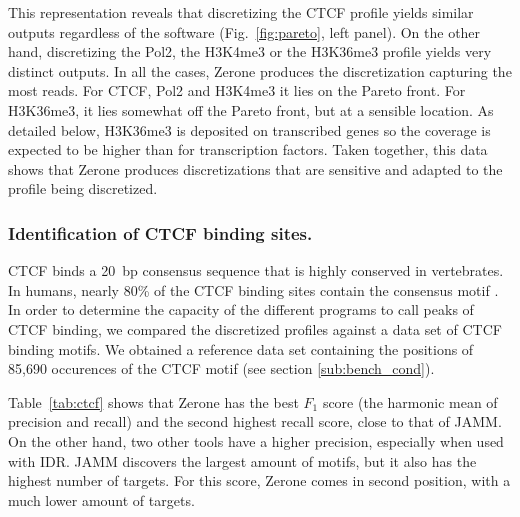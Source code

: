 \documentclass{bioinfo}
\begin{document}
This representation reveals that discretizing the CTCF profile yields
similar outputs regardless of the software (Fig.~\ref{fig:pareto},
left panel). On the other hand, discretizing the Pol2, the H3K4me3 or
the H3K36me3 profile yields very distinct outputs. In
all the cases, Zerone produces the discretization capturing the most
reads. For CTCF, Pol2 and H3K4me3 it lies on the Pareto front. For
H3K36me3, it lies somewhat off the Pareto front, but at a sensible
location. As detailed below, H3K36me3 is deposited on transcribed
genes \citep{pmid16122420,pmid23739122} so the coverage is expected to
be higher than for transcription factors. Taken together, this data
shows that Zerone produces discretizations that are sensitive and
adapted to the profile being discretized.

\subsubsection{Identification of CTCF binding sites.}
CTCF binds a 20~bp consensus sequence that is highly conserved in
vertebrates. In humans, nearly 80\% of the CTCF binding sites contain
the consensus motif \citep{pmid17382889}. In order to determine the
capacity of the different programs to call peaks of CTCF binding, we
compared the discretized profiles against a data set of CTCF binding
motifs. We obtained a reference data set containing the positions of
85,690 occurences of the CTCF motif (see section
\ref{sub:bench_cond}).

Table~\ref{tab:ctcf} shows that Zerone has the best $F_1$ score (the
harmonic mean of precision and recall) and the second highest recall
score, close to that of JAMM. On the other hand, two other tools
have a higher precision, especially when used with IDR. JAMM discovers
the largest amount of motifs, but it also has the highest number
of targets. For this score, Zerone comes in second position, with a
much lower amount of targets.
\end{document}
